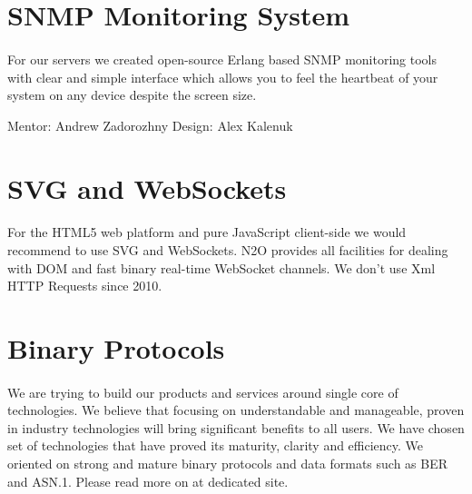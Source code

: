 \documentclass[11pt]{article}
\begin{document}
\section*{SNMP Monitoring System}
\paragraph{}
    For our servers we created open-source Erlang based SNMP monitoring tools
    with clear and simple interface which allows you to feel the heartbeat of
    your system on any device despite the screen size.


Mentor: Andrew Zadorozhny \@br Design: Alex Kalenuk


\section*{SVG and WebSockets}
\paragraph{}
    For the HTML5 web platform and pure JavaScript client-side we would recommend to use
    SVG and WebSockets. N2O provides all facilities for dealing with DOM and fast binary
    real-time WebSocket channels. We don't use Xml HTTP Requests since 2010.



\section*{Binary Protocols}
\paragraph{}
    We are trying to build our products and services around single core of technologies.
    We believe that focusing on understandable and manageable,
    proven in industry technologies will bring significant benefits to all users.
    We have chosen set of technologies that have proved its maturity, clarity and efficiency.
    We oriented on strong and mature binary protocols and data formats such as BER and ASN.1.
    Please read more on  at dedicated site.




\end{document}
